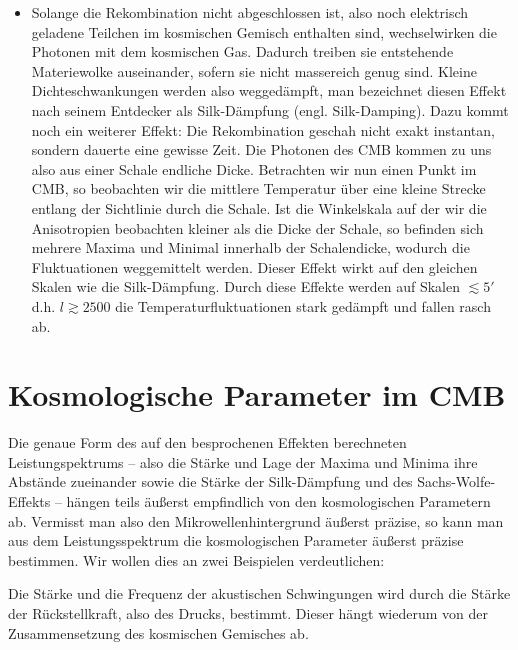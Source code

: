 \documentclass[10pt,a4paper]{article}
\begin{document}
\begin{itemize}
\item Solange die Rekombination nicht abgeschlossen ist, also noch elektrisch geladene Teilchen im kosmischen Gemisch enthalten sind, wechselwirken die Photonen mit dem kosmischen Gas. Dadurch treiben sie entstehende Materiewolke auseinander, sofern sie nicht massereich genug sind. Kleine Dichteschwankungen werden also weggedämpft, man bezeichnet diesen Effekt nach seinem Entdecker als Silk-Dämpfung (engl. Silk-Damping).\cite{A+R} Dazu kommt noch ein weiterer Effekt: Die Rekombination geschah nicht exakt instantan, sondern dauerte eine gewisse Zeit. Die Photonen des CMB kommen zu uns also aus einer Schale endliche Dicke. Betrachten wir nun einen Punkt im CMB, so beobachten wir die mittlere Temperatur über eine kleine Strecke entlang der Sichtlinie durch die Schale. Ist die Winkelskala auf der wir die Anisotropien beobachten kleiner als die Dicke der Schale, so befinden sich mehrere Maxima und Minimal innerhalb der Schalendicke, wodurch die Fluktuationen weggemittelt werden. Dieser Effekt wirkt auf den gleichen Skalen wie die Silk-Dämpfung. Durch diese Effekte werden auf Skalen $\lesssim 5'$ d.h. $l\gtrsim2500$ die Temperaturfluktuationen stark gedämpft und fallen rasch ab.\cite{Schneider}
\end{itemize}

\section{Kosmologische Parameter im CMB}
Die genaue Form des auf den besprochenen Effekten berechneten Leistungspektrums -- also die Stärke und Lage der Maxima und Minima ihre Abstände zueinander sowie die Stärke der Silk-Dämpfung und des Sachs-Wolfe-Effekts -- hängen teils äußerst empfindlich von den kosmologischen Parametern ab. Vermisst man also den Mikrowellenhintergrund äußerst präzise, so kann man aus dem Leistungsspektrum die kosmologischen Parameter äußerst präzise bestimmen.
Wir wollen dies an zwei Beispielen verdeutlichen:

Die Stärke und die Frequenz der akustischen Schwingungen wird durch die Stärke der Rückstellkraft, also des Drucks, bestimmt. Dieser hängt wiederum von der Zusammensetzung des kosmischen Gemisches ab.\cite{S+W00}
\end{document}
